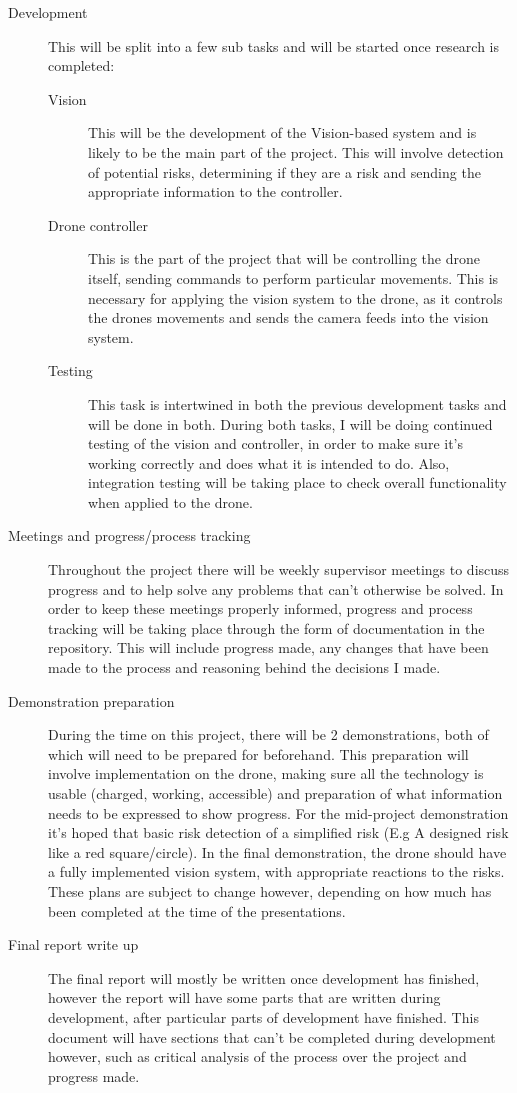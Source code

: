 \documentclass[11pt,fleqn,twoside]{article}
\begin{document}
\begin{description}
  \item[Development]
    This will be split into a few sub tasks and will be started once research is completed:
    \begin{description}
      \item[Vision]
        This will be the development of the Vision-based system and is likely to be the main part of the project. This will involve detection of potential risks, determining if they are a risk and sending the appropriate information to the controller.
      \item[Drone controller]
        This is the part of the project that will be controlling the drone itself, sending commands to perform particular movements. This is necessary for applying the vision system to the drone, as it controls the drones movements and sends the camera feeds into the vision system.
      \item[Testing]
        This task is intertwined in both the previous development tasks and will be done in both. During both tasks, I will be doing continued testing of the vision and controller, in order to make sure it's working correctly and does what it is intended to do. Also, integration testing will be taking place to check overall functionality when applied to the drone. 
    \end{description}
  \item[Meetings and progress/process tracking]
    Throughout the project there will be weekly supervisor meetings to discuss progress and to help solve any problems that can't otherwise be solved. In order to keep these meetings properly informed, progress and process tracking will be taking place through the form of documentation in the repository. This will include progress made, any changes that have been made to the process and reasoning behind the decisions I made.
  \item[Demonstration preparation]
    During the time on this project, there will be 2 demonstrations, both of which will need to be prepared for beforehand. This preparation will involve implementation on the drone, making sure all the technology is usable (charged, working, accessible) and preparation of what information needs to be expressed to show progress. For the mid-project demonstration it's hoped that basic risk detection of a simplified risk (E.g A designed risk like a red square/circle). In the final demonstration, the drone should have a fully implemented vision system, with appropriate reactions to the risks. These plans are subject to change however, depending on how much has been completed at the time of the presentations.
  \item[Final report write up]
    The final report will mostly be written once development has finished, however the report will have some parts that are written during development, after particular parts of development have finished. This document will have sections that can't be completed during development however, such as critical analysis of the process over the project and progress made. 
\end{description}
\end{document}
